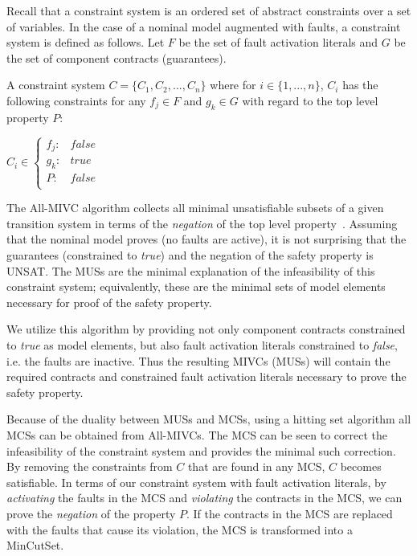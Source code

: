 Recall that a constraint system is an ordered set of abstract constraints over a set of variables. In the case of a nominal model augmented with faults, a constraint system is defined as follows. Let $F$ be the set of fault activation literals and $G$ be the set of component contracts (guarantees). 

\begin{definition}A constraint system $C = \{C_1,C_2,...,C_n\}$ where for $i \in \{1,...,n\}$, $C_i$ has the following constraints for any $f_j \in F$ and $g_k \in G$ with regard to the top level property $P$: 
\begin{center}
$C_i \in \left\{ \begin{array}{ll}
	f_j :&  false\\
	g_k :& true\\
	P :& false\\
\end{array}\right.$	
\end{center}
\label{def:constraintsystem}
\end{definition}

The All-MIVC algorithm collects all minimal unsatisfiable subsets of a given transition system in terms of the \textit{negation} of the top level property~\cite{Ghassabani2017EfficientGO,bendik2018online}. Assuming that the nominal model proves (no faults are active), it is not surprising that the guarantees (constrained to \textit{true}) and the negation of the safety property is UNSAT. The MUSs are the minimal explanation of the infeasibility of this constraint system; equivalently, these are the minimal sets of model elements necessary for proof of the safety property.

We utilize this algorithm by providing not only component contracts constrained to \textit{true} as model elements, but also fault activation literals constrained to \textit{false}, i.e. the faults are inactive. Thus the resulting MIVCs (MUSs) will contain the required contracts and constrained fault activation literals necessary to prove the safety property. 

Because of the duality between MUSs and MCSs, using a hitting set algorithm all MCSs can be obtained from All-MIVCs. The MCS can be seen to correct the infeasibility of the constraint system and provides the minimal such correction. By removing the constraints from $C$ that are found in any MCS, $C$ becomes satisfiable. In terms of our constraint system with fault activation literals, by \textit{activating} the faults in the MCS and \textit{violating} the contracts in the MCS, we can prove the \textit{negation} of the property $P$. If the contracts in the MCS are replaced with the faults that cause its violation, the MCS is transformed into a MinCutSet.\\

